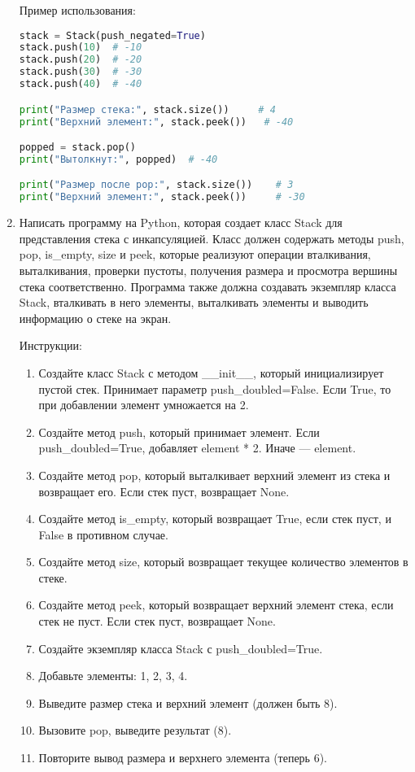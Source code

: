\begin{enumerate}
Пример использования:
\begin{lstlisting}[language=Python]
stack = Stack(push_negated=True)
stack.push(10)  # -10
stack.push(20)  # -20
stack.push(30)  # -30
stack.push(40)  # -40

print("Размер стека:", stack.size())     # 4
print("Верхний элемент:", stack.peek())   # -40

popped = stack.pop()
print("Вытолкнут:", popped)  # -40

print("Размер после pop:", stack.size())    # 3
print("Верхний элемент:", stack.peek())     # -30
\end{lstlisting}

\item Написать программу на Python, которая создает класс Stack для представления стека с инкапсуляцией. Класс должен содержать методы push, pop, is\_empty, size и peek, которые реализуют операции вталкивания, выталкивания, проверки пустоты, получения размера и просмотра вершины стека соответственно. Программа также должна создавать экземпляр класса Stack, вталкивать в него элементы, выталкивать элементы и выводить информацию о стеке на экран.

Инструкции:
\begin{enumerate}
    \item Создайте класс Stack с методом \_\_init\_\_, который инициализирует пустой стек. Принимает параметр push\_doubled=False. Если True, то при добавлении элемент умножается на 2.
    \item Создайте метод push, который принимает элемент. Если push\_doubled=True, добавляет element * 2. Иначе — element.
    \item Создайте метод pop, который выталкивает верхний элемент из стека и возвращает его. Если стек пуст, возвращает None.
    \item Создайте метод is\_empty, который возвращает True, если стек пуст, и False в противном случае.
    \item Создайте метод size, который возвращает текущее количество элементов в стеке.
    \item Создайте метод peek, который возвращает верхний элемент стека, если стек не пуст. Если стек пуст, возвращает None.
    \item Создайте экземпляр класса Stack с push\_doubled=True.
    \item Добавьте элементы: 1, 2, 3, 4.
    \item Выведите размер стека и верхний элемент (должен быть 8).
    \item Вызовите pop, выведите результат (8).
    \item Повторите вывод размера и верхнего элемента (теперь 6).
\end{enumerate}


\end{enumerate}
